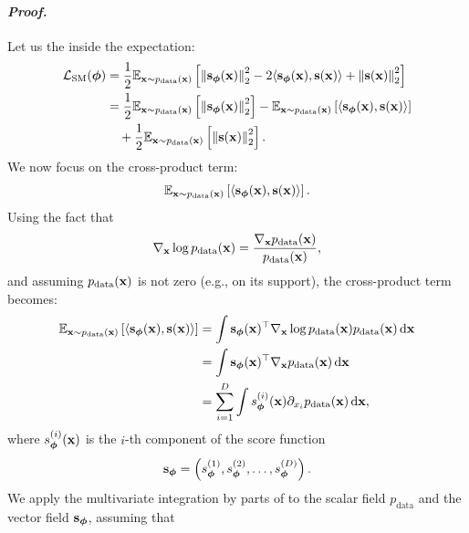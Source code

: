 \paragraph{\textit{Proof.}}

        Let us  the  inside the expectation:
        \begin{align*}
        \mathcal{L}_{\text{SM}}(\bm{\phi}) &= \frac{1}{2}\mathbb{E}_{{\mathbf{x}} \sim p_{\text{data}}({\mathbf{x}})} \left[ \left\lVert{\mathbf{s}}_{\bm{\phi}}({\mathbf{x}})\right\rVert_2^2 - 2 \langle {\mathbf{s}}_{\bm{\phi}}({\mathbf{x}}), {\mathbf{s}}({\mathbf{x}}) \rangle + \left\lVert{\mathbf{s}}({\mathbf{x}})\right\rVert_2^2 \right] \\
        &= \frac{1}{2}\mathbb{E}_{{\mathbf{x}} \sim p_{\text{data}}({\mathbf{x}})} \left[ \left\lVert{\mathbf{s}}_{\bm{\phi}}({\mathbf{x}})\right\rVert_2^2 \right] - \mathbb{E}_{{\mathbf{x}} \sim p_{\text{data}}({\mathbf{x}})} \left[ \langle {\mathbf{s}}_{\bm{\phi}}({\mathbf{x}}), {\mathbf{s}}({\mathbf{x}}) \rangle \right] \\
        &\quad + \frac{1}{2}\mathbb{E}_{{\mathbf{x}} \sim p_{\text{data}}({\mathbf{x}})} \left[ \left\lVert{\mathbf{s}}({\mathbf{x}})\right\rVert_2^2 \right].
        \end{align*}
        We now focus on the cross-product term:
        \[
        \mathbb{E}_{{\mathbf{x}} \sim p_{\text{data}}({\mathbf{x}})} \left[ \langle {\mathbf{s}}_{\bm{\phi}}({\mathbf{x}}), {\mathbf{s}}({\mathbf{x}}) \rangle \right].
        \]
        Using the fact that
        \[
        \nabla_{{\mathbf{x}}} \log p_{\text{data}}({\mathbf{x}}) = \frac{\nabla_{{\mathbf{x}}}p_{\text{data}}({\mathbf{x}})}{p_{\text{data}}({\mathbf{x}})},
        \]
        and assuming $p_{\text{data}}({\mathbf{x}})$ is not zero (e.g., on its support), the cross-product term becomes:
        \begin{align*}
            \mathbb{E}_{{\mathbf{x}} \sim p_{\text{data}}({\mathbf{x}})} \left[ \langle {\mathbf{s}}_{\bm{\phi}}({\mathbf{x}}), {\mathbf{s}}({\mathbf{x}}) \rangle \right] 
             &= \int {\mathbf{s}}_{\bm{\phi}}({\mathbf{x}})^\top  \nabla_{{\mathbf{x}}} \log p_{\text{data}}({\mathbf{x}}) p_{\text{data}}({\mathbf{x}}) \mathop{}\!\mathrm{d} {\mathbf{x}} \\
             &= \int {\mathbf{s}}_{\bm{\phi}}({\mathbf{x}})^\top  \nabla_{{\mathbf{x}}}p_{\text{data}}({\mathbf{x}}) \mathop{}\!\mathrm{d} {\mathbf{x}} \\
             &= \sum_{i=1}^{D} \int  s_{\bm{\phi}}^{(i)}({\mathbf{x}}) \partial_{x_i}p_{\text{data}}({\mathbf{x}}) \mathop{}\!\mathrm{d} {\mathbf{x}},
        \end{align*}
        where $s_{\bm{\phi}}^{(i)}({\mathbf{x}})$ is the $i$-th component of the score function 
        \[
        {\mathbf{s}}_{\bm{\phi}} = \left( s_{\bm{\phi}}^{(1)}, s_{\bm{\phi}}^{(2)}, \dots, s_{\bm{\phi}}^{(D)} \right).
        \]
        We apply the multivariate integration by parts of  to the scalar field $p_{\text{data}}$ and the vector field ${\mathbf{s}}_{\bm{\phi}}$, assuming that
